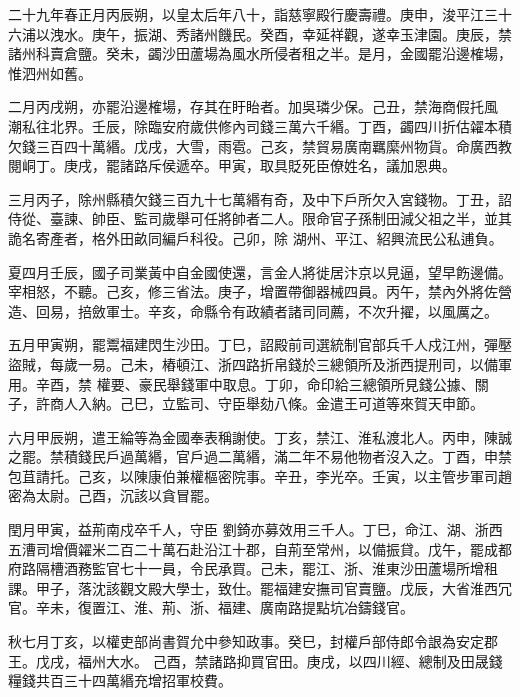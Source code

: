 \begin{pinyinscope}
 二十九年春正月丙辰朔，以皇太后年八十，詣慈寧殿行慶壽禮。庚申，浚平江三十六浦以洩水。庚午，振湖、秀諸州饑民。癸酉，幸延祥觀，遂幸玉津園。庚辰，禁諸州科賣倉鹽。癸未，蠲沙田蘆場為風水所侵者租之半。是月，金國罷沿邊榷場，惟泗州如舊。



 二月丙戌朔，亦罷沿邊榷場，存其在盱眙者。加吳璘少保。己丑，禁海商假托風
 潮私往北界。壬辰，除臨安府歲供修內司錢三萬六千緡。丁酉，蠲四川折估糴本積欠錢三百四十萬緡。戊戌，大雪，雨雹。己亥，禁貿易廣南羈縻州物貨。命廣西教閱峒丁。庚戌，罷諸路斥侯遞卒。甲寅，取具貶死臣僚姓名，議加恩典。



 三月丙子，除州縣積欠錢三百九十七萬緡有奇，及中下戶所欠入宮錢物。丁丑，詔侍從、臺諫、帥臣、監司歲舉可任將帥者二人。限命官子孫制田減父祖之半，並其詭名寄產者，格外田畝同編戶科役。己卯，除
 湖州、平江、紹興流民公私逋負。



 夏四月壬辰，國子司業黃中自金國使還，言金人將徙居汴京以見逼，望早飭邊備。宰相怒，不聽。己亥，修三省法。庚子，增置帶御器械四員。丙午，禁內外將佐營造、回易，掊斂軍士。辛亥，命縣令有政績者諸司同薦，不次升擢，以風厲之。



 五月甲寅朔，罷鬻福建閃生沙田。丁巳，詔殿前司選統制官部兵千人戍江州，彈壓盜賊，每歲一易。己未，樁頓江、浙四路折帛錢於三總領所及浙西提刑司，以備軍用。辛酉，禁
 權要、豪民舉錢軍中取息。丁卯，命印給三總領所見錢公據、關子，許商人入納。己巳，立監司、守臣舉劾八條。金遣王可道等來賀天申節。



 六月甲辰朔，遣王綸等為金國奉表稱謝使。丁亥，禁江、淮私渡北人。丙申，陳誠之罷。禁積錢民戶過萬緡，官戶過二萬緡，滿二年不易他物者沒入之。丁酉，申禁包苴請托。己亥，以陳康伯兼權樞密院事。辛丑，李光卒。壬寅，以主管步軍司趙密為太尉。己酉，沉該以貪冒罷。



 閏月甲寅，益荊南戍卒千人，守臣
 劉錡亦募效用三千人。丁巳，命江、湖、浙西五漕司增價糴米二百二十萬石赴沿江十郡，自荊至常州，以備振貸。戊午，罷成都府路隔槽酒務監官七十一員，令民承買。己未，罷江、浙、淮東沙田蘆場所增租課。甲子，落沈該觀文殿大學士，致仕。罷福建安撫司官賣鹽。戊辰，大省淮西冗官。辛未，復置江、淮、荊、浙、福建、廣南路提點坑冶鑄錢官。



 秋七月丁亥，以權吏部尚書賀允中參知政事。癸巳，封權戶部侍郎令詪為安定郡王。戊戌，福州大水。
 己酉，禁諸路抑買官田。庚戌，以四川經、總制及田晟錢糧錢共百三十四萬緡充增招軍校費。




\end{pinyinscope}
